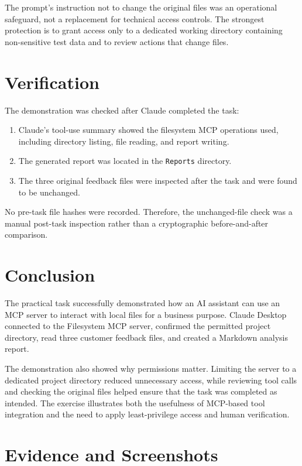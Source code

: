 \documentclass[12pt,a4paper]{article}
\begin{document}
	The prompt's instruction not to change the original files was an operational safeguard, not a replacement for technical access controls. The strongest protection is to grant access only to a dedicated working directory containing non-sensitive test data and to review actions that change files.
	
	\section{Verification}
	
	The demonstration was checked after Claude completed the task:
	\begin{enumerate}
		\item Claude's tool-use summary showed the filesystem MCP operations used, including directory listing, file reading, and report writing.
		\item The generated report was located in the \texttt{Reports} directory.
		\item The three original feedback files were inspected after the task and were found to be unchanged.
	\end{enumerate}
	
	No pre-task file hashes were recorded. Therefore, the unchanged-file check was a manual post-task inspection rather than a cryptographic before-and-after comparison.
	
	\section{Conclusion}
	
	The practical task successfully demonstrated how an AI assistant can use an MCP server to interact with local files for a business purpose. Claude Desktop connected to the Filesystem MCP server, confirmed the permitted project directory, read three customer feedback files, and created a Markdown analysis report.
	
	The demonstration also showed why permissions matter. Limiting the server to a dedicated project directory reduced unnecessary access, while reviewing tool calls and checking the original files helped ensure that the task was completed as intended. The exercise illustrates both the usefulness of MCP-based tool integration and the need to apply least-privilege access and human verification.
	
	\appendix
	\section{Evidence and Screenshots}
	
\end{document}
